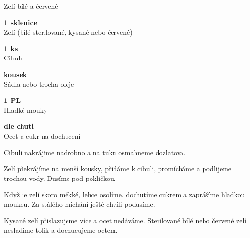 \documentclass[11pt,a4paper]{article}
\begin{document}
\begin{recipe}[MediumPurple]{Zelí bílé a červené}
    \begin{ingredients}
        \item \parbox[t]{\linewidth}{\raggedright \piece \textbf{1 sklenice}\\ Zelí (bílé sterilované, kysané nebo červené)}
        \item \parbox[t]{\linewidth}{\raggedright \piece \textbf{1 ks}\\ Cibule}
        \item \parbox[t]{\linewidth}{\raggedright \indefinite \textbf{kousek}\\ Sádla nebo trocha oleje}
        \item \parbox[t]{\linewidth}{\raggedright \spoon \textbf{1 PL}\\ Hladké mouky}
        \item \parbox[t]{\linewidth}{\raggedright \liquid \textbf{dle chuti}\\ Ocet a cukr na dochucení}
    \end{ingredients}
    \begin{steps}
        \item Cibuli nakrájíme nadrobno a na tuku osmahneme dozlatova.
        \item Zelí překrájíme na menší kousky, přidáme k cibuli, promícháme a podlijeme trochou vody. Dusíme pod pokličkou.
        \item Když je zelí skoro měkké, lehce osolíme, dochutíme cukrem a zaprášíme hladkou moukou. Za stálého míchání ještě chvíli podusíme.
        \item Kysané zelí přislazujeme více a ocet nedáváme. Sterilované bílé nebo červené zelí nesladíme tolik a dochucujeme octem.
    \end{steps}
\end{recipe}
\end{document}
